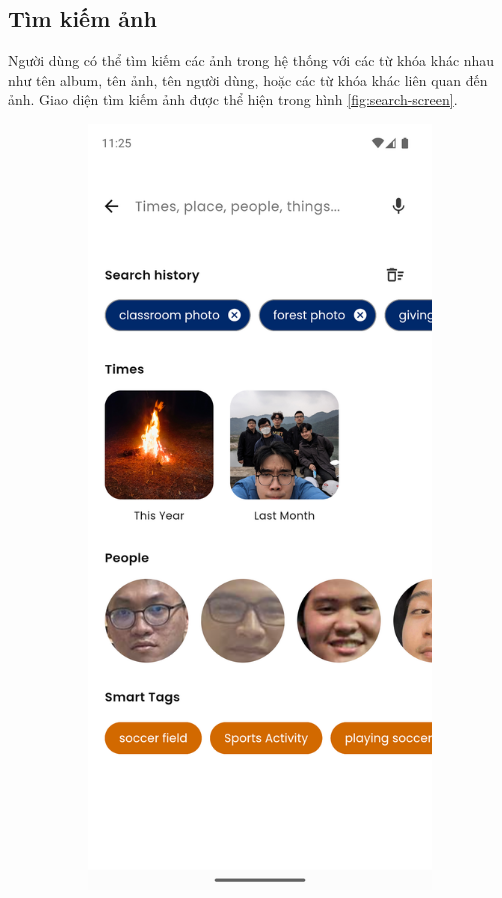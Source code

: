 \subsection{Tìm kiếm ảnh}

Người dùng có thể tìm kiếm các ảnh trong hệ thống với các từ khóa khác nhau như tên album, tên ảnh, tên người dùng, hoặc các từ khóa khác liên quan đến ảnh. Giao diện tìm kiếm ảnh được thể hiện trong hình \ref{fig:search-screen}. 

\begin{figure}[H]
    \centering
    \begin{subfigure}{0.48\textwidth}
        \includegraphics[width=1\linewidth]{figures/c4/4-2/search_1.png} 

\end{subfigure}
\end{figure}
